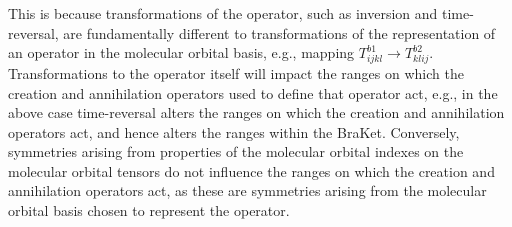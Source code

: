 \noindent This is because transformations of the operator, such as inversion
and time-reversal, are fundamentally different to transformations of the
representation of an operator in the molecular orbital basis, e.g., mapping
$T_{ijkl}^{b1} \rightarrow T_{klij}^{b2} $. Transformations to the operator
itself will impact the ranges on which the creation and annihilation operators
used to define that operator act, e.g., in the above case time-reversal alters
the ranges on which the creation and annihilation operators act, and hence
alters the ranges within the BraKet.  Conversely, symmetries arising from
properties of the molecular orbital indexes on the molecular orbital tensors do
not influence the ranges on which the creation and annihilation operators act,
as these are symmetries arising from the molecular orbital basis chosen to
represent the operator.\\


